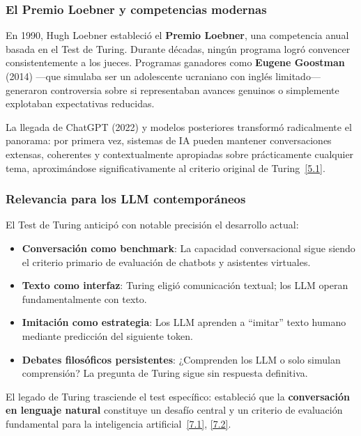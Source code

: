\documentclass[12pt,a4paper]{report}
\numberwithin{figure}{section}
\begin{document}
\subsubsection{El Premio Loebner y competencias modernas}
\label{subsubsec:premio_loebner}

En 1990, Hugh Loebner estableció el \textbf{Premio Loebner}, una competencia anual basada en el Test de Turing. Durante décadas, ningún programa logró convencer consistentemente a los jueces. Programas ganadores como \textbf{Eugene Goostman} (2014) ---que simulaba ser un adolescente ucraniano con inglés limitado--- generaron controversia sobre si representaban avances genuinos o simplemente explotaban expectativas reducidas.

La llegada de ChatGPT (2022) y modelos posteriores transformó radicalmente el panorama: por primera vez, sistemas de IA pueden mantener conversaciones extensas, coherentes y contextualmente apropiadas sobre prácticamente cualquier tema, aproximándose significativamente al criterio original de Turing~\hyperref[ref:5.1]{[5.1]}.

\subsubsection{Relevancia para los LLM contemporáneos}
\label{subsubsec:relevancia_llm}

El Test de Turing anticipó con notable precisión el desarrollo actual:

\begin{itemize}
    \item \textbf{Conversación como benchmark}: La capacidad conversacional sigue siendo el criterio primario de evaluación de chatbots y asistentes virtuales.
    
    \item \textbf{Texto como interfaz}: Turing eligió comunicación textual; los LLM operan fundamentalmente con texto.
    
    \item \textbf{Imitación como estrategia}: Los LLM aprenden a ``imitar'' texto humano mediante predicción del siguiente token.
    
    \item \textbf{Debates filosóficos persistentes}: ¿Comprenden los LLM o solo simulan comprensión? La pregunta de Turing sigue sin respuesta definitiva.
\end{itemize}

El legado de Turing trasciende el test específico: estableció que la \textbf{conversación en lenguaje natural} constituye un desafío central y un criterio de evaluación fundamental para la inteligencia artificial~\hyperref[ref:7.1]{[7.1]}, \hyperref[ref:7.2]{[7.2]}.
\end{document}
